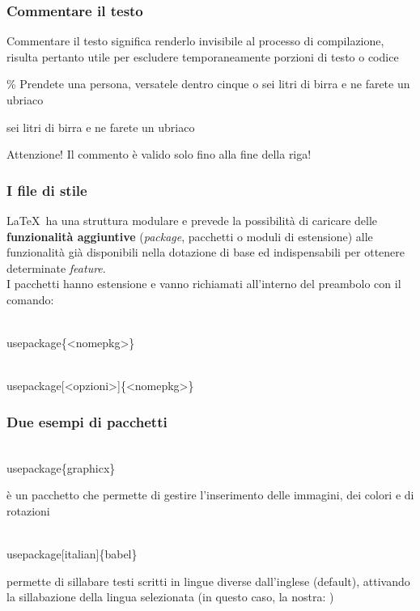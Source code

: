 \documentclass[svgnames,%
	ucs,%
	pdftex]{guitbeamer}
\begin{document}
\begin{frame}
  \frametitle{Commentare il testo}
	Commentare il testo significa renderlo invisibile al processo di
	compilazione, risulta pertanto utile per escludere temporaneamente
	porzioni di testo o codice
	\begin{LaTeXcode}
		\% Prendete una persona, versatele dentro cinque o\n
		sei litri di birra e ne farete un ubriaco
	\end{LaTeXcode}
	\begin{LaTeXoutput}
		sei litri di birra e ne farete un ubriaco
	\end{LaTeXoutput}
	\begin{block}{Attenzione!}
		Il commento \`e valido solo fino alla fine della riga!
	\end{block}
\end{frame}
\begin{frame}
  \frametitle{I file di stile}
	\LaTeX\ ha una struttura modulare e prevede la possibilit\`a di
	caricare delle \textbf{funzionalit\`a aggiuntive} (\textit{package},
	pacchetti o moduli di estensione) alle funzionalit\`a gi\`a disponibili
	nella dotazione di base ed indispensabili per ottenere determinate
	\emph{feature}.\\
  \bigskip
	I pacchetti hanno estensione  e vanno richiamati all'interno del preambolo con il comando:
	\begin{LaTeXcode}
		\\usepackage\{\alert{<nomepkg>}\}\
	\end{LaTeXcode}
  \medskip
  \onslide<3->
	\begin{LaTeXcode}
		\\usepackage[\alert{<opzioni>}]\{<nomepkg>\}\
	\end{LaTeXcode}
\end{frame}
\begin{frame}
  \frametitle{Due esempi di pacchetti}
	\begin{LaTeXcode}
		\\usepackage\{\alert{graphicx}\}
	\end{LaTeXcode}
	 \`e un pacchetto che permette di gestire l'inserimento
	delle immagini, dei colori e di rotazioni
  \bigskip
  \onslide<2->
	\begin{LaTeXcode}
		\\usepackage[\alert{italian}]\{\alert{babel}\}
	\end{LaTeXcode}
	 permette di sillabare testi scritti in lingue diverse 
	dall'inglese (default), attivando la sillabazione della lingua
	selezionata (in questo caso, la nostra: \LCmd[]{italian})
\end{frame}
\end{document}

